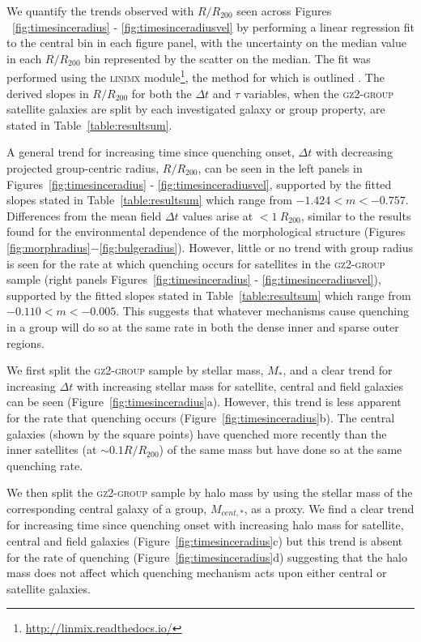 \documentclass[useAMS,usenatbib]{mn2e}
\begin{document}
We quantify the trends observed with $R/R_{200}$ seen across Figures ~\ref{fig:timesinceradius} - \ref{fig:timesinceradiusvel} by performing a linear regression fit to the central bin in each figure panel, with the uncertainty on the median value in each $R/R_{200}$ bin represented by the scatter on the median. The fit was performed using the \textsc{linimx} module\footnote{\url{http://linmix.readthedocs.io/}}, the method for which is outlined \citealt{kelly07}. The derived slopes in $R/R_{200}$ for both the $\Delta t$ and $\tau$ variables, when the \textsc{gz2-group} satellite galaxies are split by each investigated galaxy or group property, are stated in Table~\ref{table:resultsum}.

A general trend for increasing time since quenching onset, $\Delta t$ with decreasing projected group-centric radius, $R/R_{200}$, can be seen in the left panels in Figures~\ref{fig:timesinceradius} - \ref{fig:timesinceradiusvel}, supported by the fitted slopes stated in Table~\ref{table:resultsum} which range from $-1.424 < m < -0.757$. Differences from the mean field $\Delta t$ values arise at $<1~R_{200}$, similar to the results found for the environmental dependence of the morphological structure (Figures \ref{fig:morphradius}$-$\ref{fig:bulgeradius}). However, little or no trend with group radius is seen for the rate at which quenching occurs for satellites in the \textsc{gz2-group} sample (right panels Figures~\ref{fig:timesinceradius} - \ref{fig:timesinceradiusvel}), supported by the fitted slopes stated in Table~\ref{table:resultsum} which range from $-0.110 < m < -0.005$. This suggests that whatever mechanisms cause quenching in a group will do so at the same rate in both the dense inner and sparse outer regions. 

We first split the \textsc{gz2-group} sample by stellar mass, $M_*$, and a clear trend for increasing $\Delta t$ with increasing stellar mass for satellite, central and field galaxies can be seen (Figure~\ref{fig:timesinceradius}a). However, this trend is less apparent for the rate that quenching occurs (Figure~\ref{fig:timesinceradius}b). The central galaxies (shown by the square points) have quenched more recently than the inner satellites (at $\sim0.1R/R_{200}$) of the same mass but have done so at the same quenching rate. 

We then split the \textsc{gz2-group} sample by halo mass by using the stellar mass of the corresponding central galaxy of a group, $M_{cent,*}$, as a proxy. We find a clear trend for increasing time since quenching onset with increasing halo mass for satellite, central and field galaxies (Figure~\ref{fig:timesinceradius}c) but this trend is absent for the rate of quenching (Figure~\ref{fig:timesinceradius}d) suggesting that the halo mass does not affect which quenching mechanism acts upon either central or satellite galaxies. 
\end{document}
